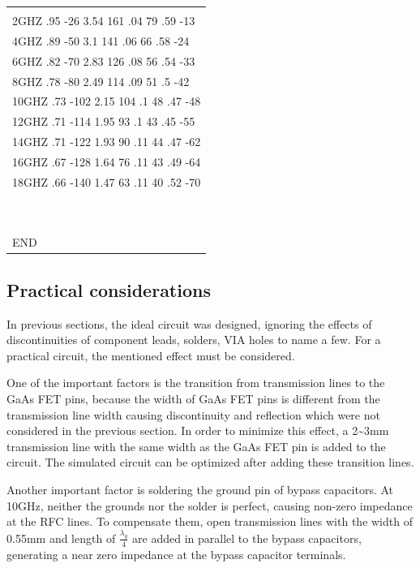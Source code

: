 \begin{longtable}[]{@{}l@{}}
\begin{minipage}[t]{0.97\columnwidth}
\begin{quote}
~\\
2GHZ .95 -26 3.54 161 .04 79 .59 -13\\
4GHZ .89 -50 3.1 141 .06 66 .58 -24\\
6GHZ .82 -70 2.83 126 .08 56 .54 -33\\
8GHZ .78 -80 2.49 114 .09 51 .5 -42\\
10GHZ .73 -102 2.15 104 .1 48 .47 -48\\
12GHZ .71 -114 1.95 93 .1 43 .45 -55\\
14GHZ .71 -122 1.93 90 .11 44 .47 -62\\
16GHZ .67 -128 1.64 76 .11 43 .49 -64\\
18GHZ .66 -140 1.47 63 .11 40 .52 -70\\
~\\
~\\
END
\end{quote}\strut
\end{minipage}\tabularnewline
\bottomrule
\end{longtable}

\hypertarget{practical-considerations}{%
\subsection{\texorpdfstring{ Practical
considerations}{ Practical considerations}}\label{practical-considerations}}

In previous sections, the ideal circuit was designed, ignoring the
effects of discontinuities of component leads, solders, VIA holes to
name a few. For a practical circuit, the mentioned effect must be
considered.

One of the important factors is the transition from transmission lines
to the GaAs FET pins, because the width of GaAs FET pins is different
from the transmission line width causing discontinuity and reflection
which were not considered in the previous section. In order to minimize
this effect, a 2\textasciitilde3mm transmission line with the same width
as the GaAs FET pin is added to the circuit. The simulated circuit can
be optimized after adding these transition lines.

Another important factor is soldering the ground pin of bypass
capacitors. At 10GHz, neither the grounds nor the solder is perfect,
causing non-zero impedance at the RFC lines. To compensate them, open
transmission lines with the width of 0.55mm and length of
\(\frac{\lambda_{g}}{4}\) are added in parallel to the bypass
capacitors, generating a near zero impedance at the bypass capacitor
terminals.

